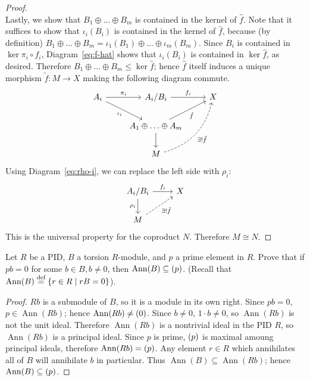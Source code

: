 \documentclass{./typewriter-math}
\DeclareMathOperator\Ann{Ann}
\begin{document}
\begin{exercise}[(DF 12.1.7)]
\begin{proof}
\begin{equation}
			\end{equation}%
			Lastly, we show that \(B_1 \oplus \ldots \oplus B_m\) is contained in the
			kernel of \(\hat{f}\). Note that it suffices to show that \(\iota_i(B_i)\)
			is contained in the kernel of \(\hat{f}\), because (by definition) \(B_1
			\oplus \ldots \oplus B_m = \iota_1(B_1) \oplus \ldots \oplus
			\iota_m(B_m)\). Since \(B_i\) is contained in \(\ker \pi_i \circ f_i\),
			Diagram~\ref{eq:f-hat} shows that \(\iota_i(B_i)\) is contained in \(\ker
			\hat{f}\), as desired. Therefore \(B_1 \oplus \ldots \oplus B_m \leq \ker
			\hat{f}\); hence \(\hat{f}\) itself induces a unique morphism \(\tilde{f}:
			M \to X\) making the following diagram commute.%
			\begin{equation}\label{eq:f-tilde}%
				\begin{tikzcd}
					A_i \arrow[r,"\pi_i"] \arrow[dr,"\iota_i",swap] & A_i/B_i
					\arrow[r,"f_i"] & X\\
					& A_1 \oplus \ldots \oplus A_m \arrow[ur,"\hat{f}",swap] \arrow[d] & \\
					& M \arrow[uur,"\exists ! \tilde{f}",dashed,swap, bend right=30] &
				\end{tikzcd}
			\end{equation}%
			Using Diagram~\ref{eq:rho-i}, we can replace the left side with
			\(\rho_i\):%
			\[%
				\begin{tikzcd}
					A_i/B_i \arrow[d,"\rho_i",swap] \arrow[r,"f_i"] & X\\
					M \arrow[ur,"\exists ! \tilde{f}", dashed, swap] &
				\end{tikzcd}
			\]%
			This is the universal property for the coproduct \(N\). Therefore \(M
			\cong N\).
		\end{proof}
	\end{exercise}

	\begin{exercise}[(DF 12.1.8)]
		Let \(R\) be a PID, \(B\) a torsion \(R\)-module, and \(p\) a prime element
		in \(R\). Prove that if \(pb = 0\) for some \(b \in B, b \neq 0\), then
		\(\Ann(B) \subseteq \pwrap{p}\). (Recall that \(\Ann(B) \eqdef \bwrap{ r
		\in R \mid r B = 0 }\)).

		\begin{proof}
			\(R b\) is a submodule of \(B\), so it is a module in its own right. Since
			\(p b = 0\), \(p \in \Ann(R b)\); hence \(\Ann(R b) \neq \pwrap{0}\).
			Since \(b \neq 0\), \(1 \cdot b \neq 0\), so \(\Ann(R b)\) is not the unit
			ideal. Therefore \(\Ann(R b)\) is a nontrivial ideal in the PID \(R\), so
			\(\Ann(R b)\) is a principal ideal. Since \(p\) is prime, \({\left(p\right)}\) is
			maximal amoung principal ideals, therefore \(\Ann(R b) = \pwrap{p}\). Any
			element \(r \in R\) which annihilates all of \(B\) will annihilate \(b\)
			in particular. Thus \(\Ann(B) \subseteq \Ann(R b)\); hence \(\Ann(B)
			\subseteq \pwrap{p}\).
		\end{proof}
	\end{exercise}
\end{document}
